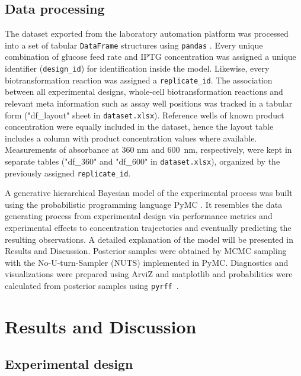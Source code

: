 \documentclass[sn-standardnature]{sn-jnl}%
\theoremstyle{thmstyleone}%
\theoremstyle{thmstyletwo}%
\theoremstyle{thmstylethree}%
\begin{document}
\subsection{Data processing}
\label{sec_mm_computational}

The dataset exported from the laboratory automation platform was processed into a set of tabular \texttt{DataFrame} structures using \texttt{pandas} \cite{pandasSoftware,pandasPaper}.
Every unique combination of glucose feed rate and IPTG concentration was assigned a unique identifier (\texttt{design\_id}) for identification inside the model.
Likewise, every biotransformation reaction was assigned a \texttt{replicate\_id}.
The association between all experimental designs, whole-cell biotransformation reactions and relevant meta information such as assay well positions was tracked in a tabular form ("df\_layout" sheet in \texttt{dataset.xlsx}).
Reference wells of known product concentration were equally included in the dataset, hence the layout table includes a column with product concentration values where available.
Measurements of absorbance at 360 nm and 600~nm, respectively, were kept in separate tables ("df\_360" and "df\_600" in \texttt{dataset.xlsx}), organized by the previously assigned \texttt{replicate\_id}.

A generative hierarchical Bayesian model of the experimental process was built using the probabilistic programming language PyMC \cite{pymc3,pymcZenodo}.
It resembles the data generating process from experimental design via performance metrics and experimental effects to concentration trajectories and eventually predicting the resulting observations.
A detailed explanation of the model will be presented in Results and Discussion.
Posterior samples were obtained by MCMC sampling with the No-U-turn-Sampler (NUTS) implemented in PyMC.
Diagnostics and visualizations were prepared using ArviZ and matplotlib \cite{arviz,arvizPaper,matplotlib,matplotlibPaper} and probabilities were calculated from posterior samples using \texttt{pyrff}~\cite{pyrff}.



\section{Results and Discussion}
\label{sec_results}

\subsection{Experimental design}
\end{document}
